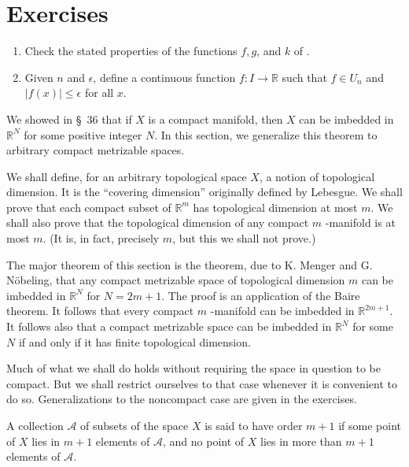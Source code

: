 \section*{Exercises}
\begin{enumerate}[itemsep=0.4em, parsep=0pt, topsep=0pt, partopsep=0pt, leftmargin=*, label=\arabic*., ref=\arabic*]
\item Check the stated properties of the functions \(f,g\), and \(k\) of .
\item Given \(n\) and \(\epsilon\), define a continuous function \(f : I \rightarrow \mathbb{R}\) such that \(f \in {U}_{n}\) and \(| {f(x) }| \leq \epsilon\) for all \(x\).
\end{enumerate}

We showed in \S\ 36 that if \(X\) is a compact manifold, then \(X\) can be imbedded in \(\mathbb{R}^{N}\) for some positive integer \(N\). In this section, we generalize this theorem to arbitrary compact metrizable spaces.

We shall define, for an arbitrary topological space \(X\), a notion of topological dimension. It is the ``covering dimension'' originally defined by Lebesgue. We shall prove that each compact subset of \(\mathbb{R}^{m}\) has topological dimension at most \(m\). We shall also prove that the topological dimension of any compact \(m\) -manifold is at most \(m\). (It is, in fact, precisely \(m\), but this we shall not prove.)

The major theorem of this section is the theorem, due to K. Menger and G. Nöbeling, that any compact metrizable space of topological dimension \(m\) can be imbedded in \(\mathbb{R}^{N}\) for \(N = {2m} + 1\). The proof is an application of the Baire theorem. It follows that every compact \(m\) -manifold can be imbedded in \(\mathbb{R}^{{2m} + 1}\). It follows also that a compact metrizable space can be imbedded in \(\mathbb{R}^{N}\) for some \(N\) if and only if it has finite topological dimension.

Much of what we shall do holds without requiring the space in question to be compact. But we shall restrict ourselves to that case whenever it is convenient to do so. Generalizations to the noncompact case are given in the exercises.

\begin{definition}
A collection \(\mathcal{A}\) of subsets of the space \(X\) is said to have order \(m + 1\) if some point of \(X\) lies in \(m + 1\) elements of \(\mathcal{A}\), and no point of \(X\) lies in more than \(m + 1\) elements of \(\mathcal{A}\).
\end{definition}

